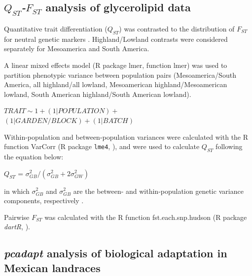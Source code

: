 \documentclass[9pt,twocolumn,twoside,lineno]{BioRxiv}
\begin{document}
\subsection{\textit{$Q_{ST}$-$F_{ST}$} analysis of glycerolipid data}
Quantitative trait differentiation ($Q_{ST}$) was contrasted to the distribution of $F_{ST}$ for neutral genetic markers \cite{whitlock2008evolutionary}.
Highland/Lowland contrasts were considered separately for Mesoamerica and South America.

A linear mixed effects model (R package lmer, function lmer) was used to partition phenotypic variance between population pairs (Mesoamerica/South America, all highland/all lowland, Mesoamerican highland/Mesoamerican lowland, South American highland/South American lowland).

\begin{center}

${ TRAIT \sim 1 + (1|POPULATION) + }$\\
${(1|GARDEN/BLOCK) + (1|BATCH)}$

\end{center}

Within-population and between-population variances were calculated with the R function VarCorr (R package \texttt{lme4}, \citealp{bates2014lme4}), and were used to calculate $Q_{ST}$ following the equation below:

\begin{center}
$Q_{ST}$ = \(\sigma^{2}_{GB}/(\sigma^{2}_{GB}+2\sigma^{2}_{GW})\)
\end{center}

\noindent in which $\sigma^{2}_{GB}$ and $\sigma^{2}_{GB}$ are the between- and within-population genetic variance components, respectively \cite{Leinonen2013-ic}.

Pairwise $F_{ST}$ was calculated with the R function fst.each.snp.hudson (R package \textit{dartR}, \citealp{gruber2018dartr}).

\subsection{\textit{pcadapt} analysis of biological adaptation in Mexican landraces}
\end{document}

